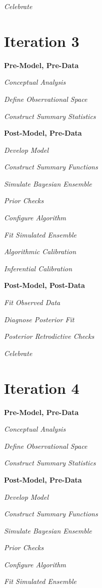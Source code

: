 \documentclass[11pt, oneside, openany]{scrbook}
\begin{document}
\emph{Celebrate}

\hypertarget{iter3}{%
\section{Iteration 3}\label{iter3}}

\textbf{Pre-Model, Pre-Data}

\emph{Conceptual Analysis}

\emph{Define Observational Space}

\emph{Construct Summary Statistics}

\textbf{Post-Model, Pre-Data}

\emph{Develop Model}

\emph{Construct Summary Functions}

\emph{Simulate Bayesian Ensemble}

\emph{Prior Checks}

\emph{Configure Algorithm}

\emph{Fit Simulated Ensemble}

\emph{Algorithmic Calibration}

\emph{Inferential Calibration}

\textbf{Post-Model, Post-Data}

\emph{Fit Observed Data}

\emph{Diagnose Posterior Fit}

\emph{Posterior Retrodictive Checks}

\emph{Celebrate}

\hypertarget{iter4}{%
\section{Iteration 4}\label{iter4}}

\textbf{Pre-Model, Pre-Data}

\emph{Conceptual Analysis}

\emph{Define Observational Space}

\emph{Construct Summary Statistics}

\textbf{Post-Model, Pre-Data}

\emph{Develop Model}

\emph{Construct Summary Functions}

\emph{Simulate Bayesian Ensemble}

\emph{Prior Checks}

\emph{Configure Algorithm}

\emph{Fit Simulated Ensemble}
\end{document}
